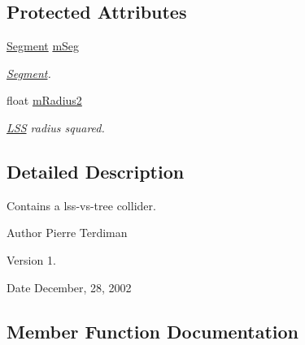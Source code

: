 \subsection*{Protected Attributes}
\begin{DoxyCompactItemize}
\item 
\hyperlink{classSegment}{Segment} \hyperlink{classLSSCollider_a644a06ae278436a8a540c4f49f13c73f}{m\+Seg}\hypertarget{classLSSCollider_a644a06ae278436a8a540c4f49f13c73f}{}\label{classLSSCollider_a644a06ae278436a8a540c4f49f13c73f}

\begin{DoxyCompactList}\small\item\em \hyperlink{classSegment}{Segment}. \end{DoxyCompactList}\item 
float \hyperlink{classLSSCollider_a84f3909ea162922bc5778122b719831d}{m\+Radius2}\hypertarget{classLSSCollider_a84f3909ea162922bc5778122b719831d}{}\label{classLSSCollider_a84f3909ea162922bc5778122b719831d}

\begin{DoxyCompactList}\small\item\em \hyperlink{classLSS}{L\+SS} radius squared. \end{DoxyCompactList}\end{DoxyCompactItemize}


\subsection{Detailed Description}
Contains a lss-\/vs-\/tree collider.

\begin{DoxyAuthor}{Author}
Pierre Terdiman 
\end{DoxyAuthor}
\begin{DoxyVersion}{Version}
1. 
\end{DoxyVersion}
\begin{DoxyDate}{Date}
December, 28, 2002 
\end{DoxyDate}


\subsection{Member Function Documentation}
